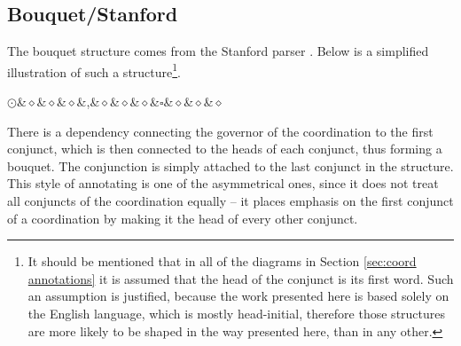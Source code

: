 \subsection{Bouquet/Stanford}
The bouquet structure comes from the Stanford parser \citep{de-marneffe-etal-2006-generating}. Below is a simplified illustration of such a structure\footnote{It should be mentioned that in all of the diagrams in Section \ref{sec:coord annotations} it is assumed that the head of the conjunct is its first word. Such an assumption is justified, because the work presented here is based solely on the English language, which is mostly head-initial, therefore those structures are more likely to be shaped in the way presented here, than in any other.}.

\begin{exe}
\ex\label{ex:bouquet}
\begin{Center}
\begin{dependency}[theme = simple]
        \begin{deptext}
        
        $\odot$\&$\diamond$\&$\diamond$\&$\diamond$\&,\&$\diamond$\&$\diamond$\&$\diamond$\&$\square$\&$\diamond$\&$\diamond$\&$\diamond$\\
            \end{deptext}
        \end{dependency}
\end{Center}
\end{exe}

There is a dependency connecting the governor of the coordination to the first conjunct, which is then connected to the heads of each conjunct, thus forming a bouquet. The conjunction is simply attached to the last conjunct in the structure. This style of annotating is one of the asymmetrical ones, since it does not treat all conjuncts of the coordination equally -- it places emphasis on the first conjunct of a coordination by making it the head of every other conjunct. 

